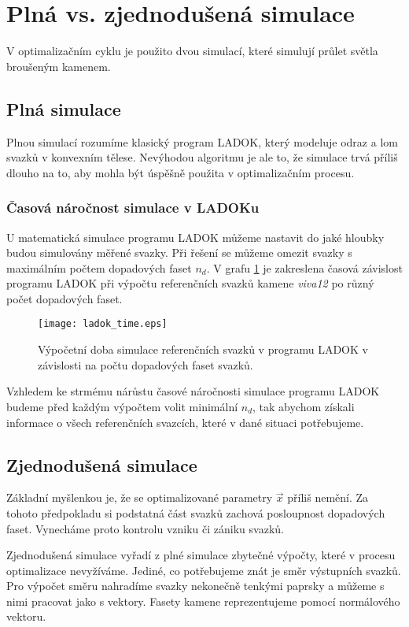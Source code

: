 \section{Plná vs. zjednodušená simulace}
V optimalizačním cyklu je použito dvou simulací, které simulují průlet světla broušeným kamenem.

\subsection{Plná simulace}
Plnou simulací rozumíme klasický program LADOK, který modeluje odraz a lom svazků v konvexním tělese. Nevýhodou algoritmu je ale to, že simulace trvá příliš dlouho na to, aby mohla být úspěšně použita v optimalizačním procesu.

\subsubsection{Časová náročnost simulace v LADOKu}
	U matematická simulace programu LADOK můžeme nastavit do jaké hloubky budou simulovány měřené svazky. Při řešení se můžeme omezit svazky s maximálním počtem dopadových faset $n_d$. V grafu \ref{fig: ladok_time} je zakreslena časová závislost programu LADOK při výpočtu referenčních svazků kamene \textit{viva12} po různý počet dopadových faset. 
	
	\begin{figure}[htbp]
    \centering\texttt{[image: ladok\_time.eps]}
     \caption[Časová náročnost simulace - LADOK.]{Výpočetní doba simulace referenčních svazků v programu LADOK v závislosti na počtu dopadových faset svazků.}
 \label{fig: ladok_time}
 \end{figure}

	
	Vzhledem ke strmému nárůstu časové náročnosti simulace programu LADOK budeme před každým výpočtem volit minimální $n_d$, tak abychom získali informace o všech referenčních svazcích, které v dané situaci potřebujeme.      


\subsection{Zjednodušená simulace}
Základní myšlenkou je, že se optimalizované parametry $\vec{x}$ příliš nemění. Za tohoto předpokladu si podstatná část svazků zachová posloupnost dopadových faset. Vynecháme proto kontrolu vzniku či zániku svazků. 

Zjednodušená simulace vyřadí z plné simulace zbytečné výpočty, které v procesu optimalizace nevyžíváme. 
Jediné, co potřebujeme znát je směr výstupních svazků. Pro výpočet směru nahradíme svazky nekonečně tenkými paprsky a můžeme s nimi pracovat jako s vektory. Fasety kamene reprezentujeme pomocí normálového vektoru. 

